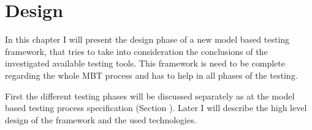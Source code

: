 \chapter{Design}
\label{cha:design}

In this chapter I will present the design phase of a new model based testing framework, that tries to take into consideration the conclusions of the investigated available testing tools. This framework is need to be complete regarding the whole MBT process and has to help in all phases of the testing.

First the different testing phases will be discussed separately as at the model based testing process specification (Section \cite{sec:process}). Later I will describe the high level design of the framework and the used technologies.

